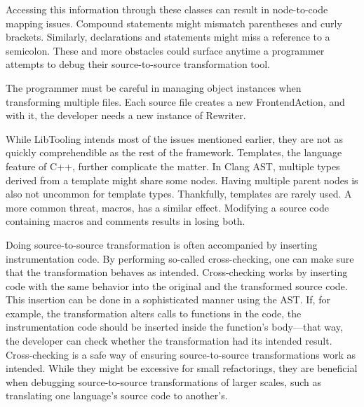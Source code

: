 Accessing this information through these classes can result in 
node-to-code mapping issues. 
Compound statements might mismatch parentheses and curly brackets. 
Similarly, declarations and statements might miss a reference to 
a semicolon. 
These and more obstacles could surface anytime a programmer attempts 
to debug their source-to-source transformation tool. 

The programmer must be careful in managing object instances when 
transforming multiple files. 
Each source file creates a new FrontendAction, and with it, 
the developer needs a new instance of Rewriter.

While LibTooling intends most of the issues mentioned earlier, 
they are not as quickly comprehendible as the rest of the framework. 
Templates, the language feature of C++, further complicate the matter. 
In Clang AST, multiple types derived from a template might share some nodes. 
Having multiple parent nodes is also not uncommon for template types. 
Thankfully, templates are rarely used. 
A more common threat, macros, has a similar effect. 
Modifying a source code containing macros and comments results in 
losing both.

Doing source-to-source transformation is often accompanied by 
inserting instrumentation code. 
By performing so-called cross-checking, one can make sure that 
the transformation behaves as intended. 
Cross-checking works by inserting code with the same behavior 
into the original and the transformed source code.  
This insertion can be done in a sophisticated manner using the AST. 
If, for example, the transformation alters calls to functions 
in the code, the instrumentation code should be inserted inside the 
function's body—that way, the developer can check whether 
the transformation had its intended result.
Cross-checking is a safe way of ensuring source-to-source 
transformations work as intended. 
While they might be excessive for small refactorings, 
they are beneficial when debugging source-to-source 
transformations of larger scales, such as translating 
one language's source code to another's.
